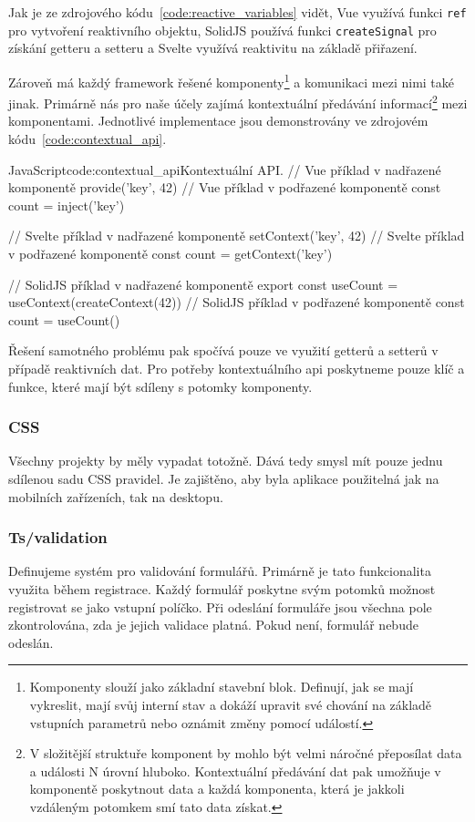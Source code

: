 \documentclass[
  master,
  program=ainf,
  tables=false,
  sourcecodes,
  glossaries,
  index
]{kidiplom}
\begin{document}
Jak je ze zdrojového kódu~\ref{code:reactive_variables} vidět, Vue \cite{vue} využívá funkci
{\tt ref} pro vytvoření reaktivního objektu,
SolidJS \cite{solidjs} používá funkci {\tt createSignal} pro získání getteru a setteru a Svelte \cite{svelte}
využívá reaktivitu na základě přiřazení. 

Zároveň má každý framework řešené komponenty\footnote{Komponenty slouží jako
  základní stavební blok. Definují, jak se mají vykreslit, mají svůj interní
  stav a dokáží upravit své chování na základě vstupních parametrů nebo
  oznámit změny pomocí událostí.} a komunikaci mezi nimi také jinak. Primárně
nás pro naše účely zajímá kontextuální předávání informací\footnote{V
  složitější struktuře komponent by mohlo být velmi náročné přeposílat data a
  události N úrovní hluboko. Kontextuální předávání dat pak umožňuje v
  komponentě poskytnout data a každá komponenta, která je jakkoli vzdáleným
  potomkem smí tato data získat.} mezi komponentami. Jednotlivé implementace 
  jsou demonstrovány ve zdrojovém kódu~\ref{code:contextual_api}.

  \begin{kicode}{JavaScript}{code:contextual_api}{Kontextuální API.}
  // Vue příklad v nadřazené komponentě
  provide('key', 42)
  // Vue příklad v podřazené komponentě
  const count = inject('key')

  // Svelte příklad v nadřazené komponentě
  setContext('key', 42)
  // Svelte příklad v podřazené komponentě
  const count = getContext('key')

  // SolidJS příklad v nadřazené komponentě
  export const useCount = useContext(createContext(42))
  // SolidJS příklad v podřazené komponentě
  const count = useCount()
\end{kicode}

Řešení samotného problému pak spočívá pouze ve využití getterů a setterů v
případě reaktivních dat. Pro potřeby kontextuálního api poskytneme pouze klíč a
funkce, které mají být sdíleny s potomky komponenty.

\subsubsection{CSS}
Všechny projekty by měly vypadat totožně. Dává tedy smysl mít pouze jednu
sdílenou sadu CSS pravidel. Je zajištěno, aby byla aplikace použitelná jak na
mobilních zařízeních, tak na desktopu.

\subsubsection{Ts/validation}
Definujeme systém pro validování formulářů. Primárně je tato funkcionalita
využita během registrace. Každý formulář poskytne svým potomků možnost
registrovat se jako vstupní políčko. Při odeslání formuláře jsou všechna pole
zkontrolována, zda je jejich validace platná. Pokud není, formulář nebude
odeslán.
\end{document}
